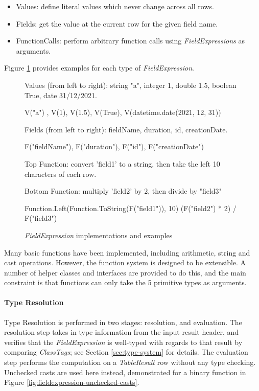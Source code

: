 \begin{itemize}
	\item Values: define literal values which never change across all rows.
	\item Fields: get the value at the current row for the given field name.
	\item FunctionCalls: perform arbitrary function calls using \textit{FieldExpressions} as arguments.
\end{itemize}

Figure \ref{fig:field-expressions-examples} provides examples for each type of \textit{FieldExpression}.
\begin{figure}[htp]
	Values (from left to right): string "a", integer 1, double 1.5, boolean True, date 31/12/2021.
	\begin{python}
V("a") , V(1), V(1.5), V(True), V(datetime.date(2021, 12, 31))
	\end{python}

	Fields (from left to right): fieldName, duration, id, creationDate.
	\begin{python}
F("fieldName"), F("duration"), F("id"), F("creationDate")
	\end{python}

	Top Function: convert 'field1' to a string, then take the left 10 characters of each row.
	
	Bottom Function: multiply 'field2' by 2, then divide by "field3"
	\begin{python}
Function.Left(Function.ToString(F("field1")), 10)
(F("field2") * 2) / F("field3")
	\end{python}
	\caption{\textit{FieldExpression} implementations and examples}
	\label{fig:field-expressions-examples}
\end{figure}

Many basic functions have been implemented, including arithmetic, string and cast operations. However, the function system is designed to be extensible. A number of helper classes and interfaces are provided to do this, and the main constraint is that functions can only take the 5 primitive types as arguments.

\paragraph{Type Resolution} 
Type Resolution is performed in two stages: resolution, and evaluation. The resolution step takes in type information from the input result header, and verifies that the \textit{FieldExpression} is well-typed with regards to that result by comparing \textit{ClassTags}; see Section \ref{sec:type-system} for details. The evaluation step performs the computation on a \textit{TableResult} row without any type checking. Unchecked casts are used here instead, demonstrated for a binary function in Figure \ref{fig:fieldexpression-unchecked-casts}. 

